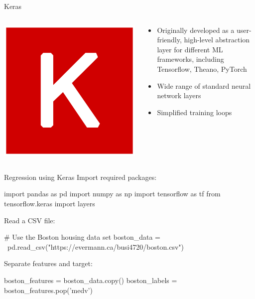\documentclass[ignorenonframetext,xcolor=x11names]{beamer}
\begin{document}
\begin{frame}{Keras}
\begin{columns}
\begin{column}{0.3\textwidth}
\includegraphics[width=.75\textwidth]{keraslogo.png}
\end{column}
\begin{column}{0.7\textwidth}
\begin{itemize}
   \item Originally developed as a user-friendly, high-level abstraction layer for different ML frameworks, including Tensorflow, Theano, PyTorch
   \item Wide range of standard neural network layers
   \item Simplified training loops
\end{itemize}
\end{column}
\end{columns}
\end{frame}


\begin{frame}[fragile]{Regression using Keras}
Import required packages:
\begin{pythoncode}
import pandas as pd
import numpy as np
import tensorflow as tf
from tensorflow.keras import layers
\end{pythoncode}
Read a CSV file:
\begin{pythoncode}
# Use the Boston housing data set
boston_data = \
    pd.read_csv("https://evermann.ca/busi4720/boston.csv")
\end{pythoncode}
Separate features and target:
\begin{pythoncode}
boston_features = boston_data.copy()
boston_labels = boston_features.pop('medv')
\end{pythoncode}
\end{frame}
\end{document}
